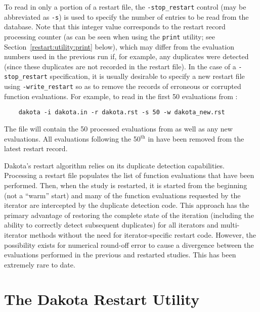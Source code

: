 To read in only a portion of a restart file, the
\texttt{-stop\_restart} control (may be abbreviated as \texttt{-s}) is
used to specify the number of entries to be read from the
database. Note that this integer value corresponds to the restart
record processing counter (as can be seen when using the
\texttt{print} utility; see Section~\ref{restart:utility:print} below),
which may differ from the evaluation numbers used in the previous run
if, for example, any duplicates were detected (since these duplicates
are not recorded in the restart file).  In the case of a
\texttt{-stop\_restart} specification, it is usually desirable to
specify a new restart file using \texttt{-write\_restart} so as to
remove the records of erroneous or corrupted function evaluations. For
example, to read in the first 50 evaluations from
:
\begin{small}
\begin{verbatim}
    dakota -i dakota.in -r dakota.rst -s 50 -w dakota_new.rst
\end{verbatim}
\end{small}

The  file will contain the 50 processed
evaluations from  as well as any new evaluations.
All evaluations following the 50$^{\mathrm{th}}$ in 
have been removed from the latest restart record.

Dakota's restart algorithm relies on its duplicate detection
capabilities. Processing a restart file populates the list of function
evaluations that have been performed. Then, when the study is
restarted, it is started from the beginning (not a ``warm'' start) and
many of the function evaluations requested by the iterator are
intercepted by the duplicate detection code. This approach has the
primary advantage of restoring the complete state of the iteration
(including the ability to correctly detect subsequent duplicates) for
all iterators and multi-iterator methods without the need for
iterator-specific restart code. However, the possibility exists for
numerical round-off error to cause a divergence between the
evaluations performed in the previous and restarted studies. This has
been extremely rare to date.

\section{The Dakota Restart Utility}\label{restart:utility}

